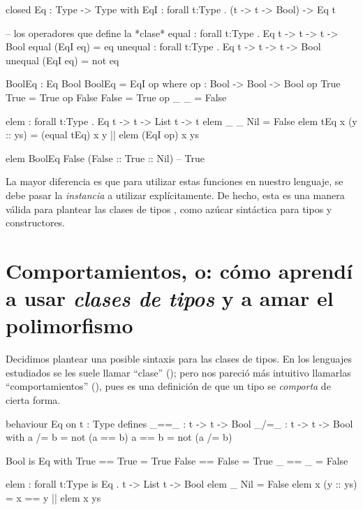 {\begin{designfr}
\begin{anglercode}
closed Eq : Type -> Type with
    EqI : forall t:Type . (t -> t -> Bool) -> Eq t

-- los operadores que define la *clase*
equal : forall t:Type . Eq t -> t -> t -> Bool
equal (EqI eq) = eq
unequal : forall t:Type . Eq t -> t -> t -> Bool
unequal (EqI eq) = not eq

BoolEq : Eq Bool
BoolEq = EqI op
    where
        op : Bool -> Bool -> Bool
        op True  True  = True
        op False False = True
        op _     _     = False

elem : forall t:Type . Eq t -> t -> List t -> t
elem _         _ Nil = False
elem tEq x (y :: ys) = (equal tEq) x y || elem (EqI op) x ys

elem BoolEq False (False :: True :: Nil)    -- True
\end{anglercode}

La mayor diferencia es que para utilizar estas funciones en nuestro lenguaje, se debe pasar la \emph{instancia} a utilizar explícitamente. De hecho, esta es una manera válida para plantear las clases de tipos \cite{scrap-type-classes}, como azúcar sintáctica para tipos y constructores.
\end{designfr}

\section{Comportamientos, o: cómo aprendí a usar \emph{clases de tipos} y a amar el polimorfismo}

\begin{designfr}
Decidimos plantear una posible sintaxis para las clases de tipos. En los lenguajes estudiados se les suele llamar \enquote{clase} (); pero nos pareció más intuitivo llamarlas \enquote{comportamientos} (), pues es una definición de que un tipo se \emph{comporta} de cierta forma.

\begin{anglercode}
behaviour Eq on t : Type defines
    _==_ : t -> t -> Bool
    _/=_ : t -> t -> Bool
  with
    a /= b = not (a == b)
    a == b = not (a /= b)

Bool is Eq with
    True  == True  = True
    False == False = True
    _     == _     = False

elem : forall t:Type is Eq . t -> List t -> Bool
elem _ Nil = False
elem x (y :: ys) = x == y || elem x ys
\end{anglercode}


\end{designfr}}
